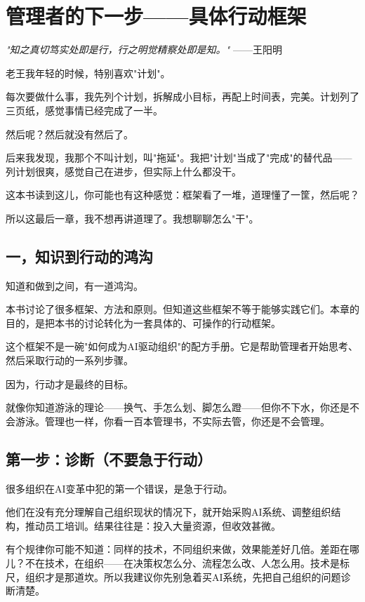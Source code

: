 \chapter{管理者的下一步——具体行动框架}


\textit{"知之真切笃实处即是行，行之明觉精察处即是知。"}
——王阳明


老王我年轻的时候，特别喜欢"计划"。

每次要做什么事，我先列个计划，拆解成小目标，再配上时间表，完美。计划列了三页纸，感觉事情已经完成了一半。

然后呢？然后就没有然后了。

后来我发现，我那个不叫计划，叫"拖延"。我把"计划"当成了"完成"的替代品——列计划很爽，感觉自己在进步，但实际上什么都没干。

这本书读到这儿，你可能也有这种感觉：框架看了一堆，道理懂了一筐，然后呢？

所以这最后一章，我不想再讲道理了。我想聊聊怎么"干"。

\section{一，知识到行动的鸿沟}


知道和做到之间，有一道鸿沟。

本书讨论了很多框架、方法和原则。但知道这些框架不等于能够实践它们。本章的目的，是把本书的讨论转化为一套具体的、可操作的行动框架。

这个框架不是一碗"如何成为AI驱动组织"的配方手册。它是帮助管理者开始思考、然后采取行动的一系列步骤。

因为，行动才是最终的目标。

就像你知道游泳的理论——换气、手怎么划、脚怎么蹬——但你不下水，你还是不会游泳。管理也一样，你看一百本管理书，不实际去管，你还是不会管理。

\section{第一步：诊断（不要急于行动）}


很多组织在AI变革中犯的第一个错误，是急于行动。

他们在没有充分理解自己组织现状的情况下，就开始采购AI系统、调整组织结构，推动员工培训。结果往往是：投入大量资源，但收效甚微。

有个规律你可能不知道：同样的技术，不同组织来做，效果能差好几倍。差距在哪儿？不在技术，在组织——在决策权怎么分、流程怎么改、人怎么用。技术是标尺，组织才是那道坎。所以我建议你先别急着买AI系统，先把自己组织的问题诊断清楚。

